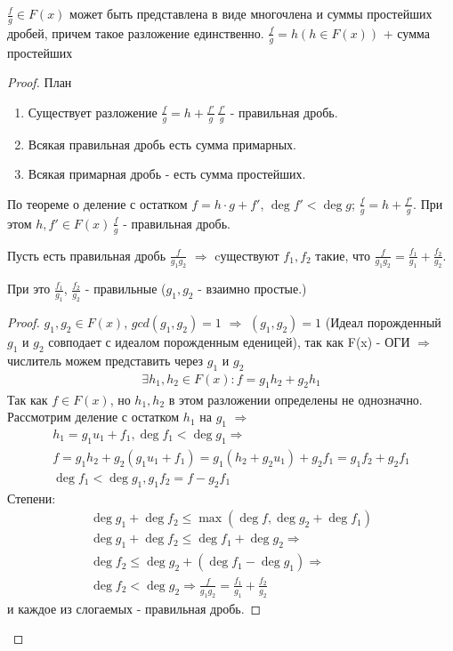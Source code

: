 \begin{theorem}{}
$\frac{f}{g} \in  F(x)$ может быть представлена в виде многочлена и суммы простейших дробей,
причем такое разложение единственно.
$\frac{f}{g} = h (h \in F(x))$ + сумма простейших

\begin{proof}
План
\begin{enumerate}
\item Существует разложение $\frac{f}{g} = h + \frac{f'}{g}\, \frac{f'}{g}$ - правильная дробь.
\item Всякая правильная дробь есть сумма примарных.
\item Всякая примарная дробь - есть сумма простейших.
\end{enumerate}

\begin{Rem}
По теореме о деление с остатком $f = h \cdot g +f'$, $\deg f' < \deg g$;
$\frac{f}{g} = h + \frac{f'}{g}$. При этом $h, f'\in F(x)\, \frac{f}{g}$ - правильная дробь.
\end{Rem}

 
\begin{lemma}
Пусть есть правильная дробь $\frac{f}{g_1 g_2}$ $\Rightarrow$ cуществуют $f_1, f_2$ такие, что
$\frac{f}{g_1 g_2} = \frac{f_1}{g_1} + \frac{f_2}{g_2}$.

При это $\frac{f_1}{g_1}$, $\frac{f_2}{g_2}$ - правильные
($g_1, g_2$ - взаимно простые.) 

\end{lemma}

\begin{proof}
$g_1, g_2 \in F(x)$, $gcd(g_1, g_2) = 1$ $\Rightarrow$ $(g_1, g_2) = 1$ (Идеал порожденный $g_1$ и $g_2$
совподает с идеалом порожденным еденицей), так как F(x) - ОГИ $\Rightarrow$ числитель можем представить через $g_1$ и $g_2$
\begin{gather*}
\exists h_1, h_2 \in F(x) : f = g_1 h_2 + g_2 h_1
\end{gather*}
Так как $f \in F(x)$, но $h_1, h_2$  в этом разложении определены не однозначно.
Рассмотрим деление с остатком $h_1$ на $g_1$ $\Rightarrow$
\begin{gather*}
h_1 = g_1 u_1 + f_1, \deg f_1 < \deg g_1 \Rightarrow \\
f = g_1 h_2 + g_2 (g_1 u_1 + f_1)= g_1 (h_2 + g_2 u_1) + g_2 f_1 = g_1 f_2 + g_2 f_1 \\
\deg f_1 < \deg g_1, g_1 f_2 = f - g_2 f_1
\end{gather*}
Степени:
\begin{gather*}
\deg g_1 + \deg f_2 \le \max (\deg f, \deg g_2 + \deg f_1) \\
\deg g_1 + \deg f_2 \le \deg f_1 + \deg g_2 \Rightarrow \\
\deg f_2 \le \deg g_2 + (\deg f_1 - \deg g_1) \Rightarrow \\
\deg f_2 < \deg g_2 \Rightarrow \frac{f}{g_1 g_2} = \frac{f_1}{g_1} + \frac{f_2}{g_2}
\end{gather*}
и каждое из слогаемых - правильная дробь.
\end{proof}


\end{proof}
\end{theorem}
